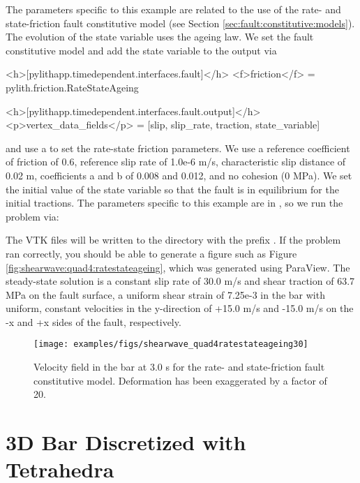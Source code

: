 The parameters specific to this example are related to the use of
the rate- and state-friction fault constitutive model (see Section
\vref{sec:fault:constitutive:models}). The evolution of the state
variable uses the ageing law. We set the fault constitutive model
and add the state variable to the output via
\begin{cfg}
<h>[pylithapp.timedependent.interfaces.fault]</h>
<f>friction</f> = pylith.friction.RateStateAgeing 

<h>[pylithapp.timedependent.interfaces.fault.output]</h>
<p>vertex_data_fields</p> = [slip, slip_rate, traction, state_variable]
\end{cfg}
and use a  to set the rate-state friction parameters. We
use a reference coefficient of friction of 0.6, reference slip rate
of 1.0e-6 m/s, characteristic slip distance of 0.02 m, coefficients
a and b of 0.008 and 0.012, and no cohesion (0 MPa). We set the initial
value of the state variable so that the fault is in equilibrium for
the initial tractions. The parameters specific to this example are
in , so we run the problem
via:
The VTK files will be written to the  directory with
the prefix . If the problem ran correctly,
you should be able to generate a figure such as Figure
\vref{fig:shearwave:quad4:ratestateageing}, which was generated using
ParaView. The steady-state solution is a constant slip rate of 30.0
m/s and shear traction of 63.7 MPa on the fault surface, a uniform
shear strain of 7.25e-3 in the bar with uniform, constant velocities
in the y-direction of +15.0 m/s and -15.0 m/s on the -x and +x sides
of the fault, respectively.

\begin{figure}
  \texttt{[image: examples/figs/shearwave\_quad4ratestateageing30]}
  \caption{Velocity field in the bar at 3.0 s for the rate- and state-friction
    fault constitutive model. Deformation has been exaggerated by a factor
    of 20.}
  \label{fig:shearwave:quad4:ratestateageing}
\end{figure}


\section{3D Bar Discretized with Tetrahedra}
\label{sec:example:shearwave:tet4}

